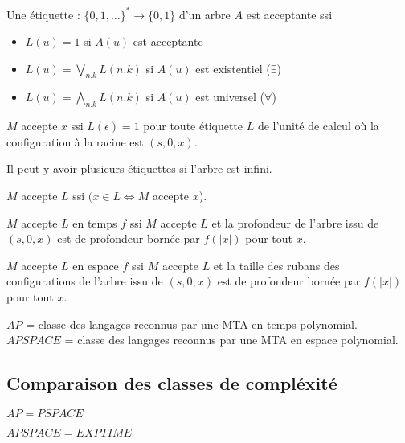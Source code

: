 \documentclass[10pt,a4paper]{article}
\begin{document}
\begin{definition}
 Une étiquette : $\{0,1,\dots \} ^* → \{0,1\}$ d'un arbre $A$ est acceptante ssi 
\begin{itemize}
 \item $L(u) = 1$ si $A(u)$ est acceptante
 \item $\displaystyle L(u) = \bigvee_{n.k} L(n.k)$ si $A(u)$ est existentiel ($\exists$)
 \item $\displaystyle L(u) = \bigwedge_{n.k} L(n.k)$ si $A(u)$ est universel ($\forall$)
\end{itemize}
\end{definition}

\begin{definition}
 $M$ accepte $x$ ssi $L(\epsilon) = 1$ pour toute étiquette $L$ de l'unité de calcul où la configuration à la racine est $(s,0,x)$.
\end{definition}
\begin{rem}
 Il peut y avoir plusieurs étiquettes si l'arbre est infini.
\end{rem}

\begin{definition}
 $M$ accepte $L$ ssi $(x \in L \Leftrightarrow M$ accepte $x$).
\end{definition}

\begin{definition}
 $M$ accepte $L$ en temps $f$ ssi $M$ accepte $L$ et la profondeur de l'arbre issu de $(s,0,x)$ est de profondeur bornée par  $f(|x|)$ pour tout $x$.
\end{definition}

\begin{definition}
 $M$ accepte $L$ en espace $f$ ssi $M$ accepte $L$ et la taille des rubans des configurations de l'arbre issu de $(s,0,x)$ est de profondeur bornée par $f(|x|)$ pour tout $x$.
\end{definition}

\begin{definition}
 $AP$ = classe des langages reconnus par une MTA en temps polynomial.\\
$APSPACE$ = classe des langages reconnus par une MTA en espace polynomial.
\end{definition}

\subsection{Comparaison des classes de compléxité}

\begin{thm}
 $AP = PSPACE$
\end{thm}

\begin{thm}
$ APSPACE = EXPTIME$
\end{thm}
\end{document}
